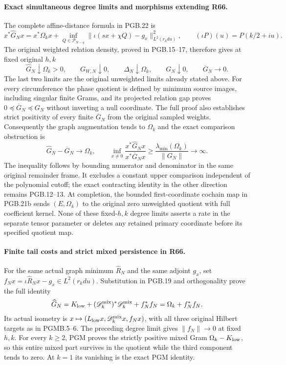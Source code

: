 \paragraph{Exact simultaneous degree limits and morphisms extending R66.}
The complete affine-distance formula in PGB.22 is
\[
 x^*\widehat G_Nx=x^*\Omega_kx+
 \inf_{Q\in\mathcal P_{N-q}}
 \|\iota(sx+\chi Q)-g_x\|_{L^2(r_kdu)}^2,
 \qquad (\iota P)(u)=P(k/2+iu).
\]
The original weighted relation density, proved in PGB.15--17,
therefore gives at fixed original $h,k$
\[
 \widehat G_N\downarrow\Omega_k>0,\qquad
 G_{W,N}\downarrow0,\qquad\Delta_N\downarrow\Omega_k,
 \qquad G_N\downarrow0,\qquad\overline G_N\to0.
\]
The last two limits are the original unweighted limits already
stated above. For every circumference the phase quotient is
defined by minimum source images, including singular finite
Grams, and its projected relation gap proves
$0\preceq\overline G_N\preceq G_N$ without inverting a null
coordinate. The full proof also establishes strict positivity
of every finite $\overline G_N$ from the original sampled
weights. Consequently the graph augmentation tends to
$\Omega_k$ and the exact comparison obstruction is
\[
 \widehat G_N-\overline G_N\longrightarrow\Omega_k,
 \qquad
 \inf_{x\ne0}\frac{x^*\widehat G_Nx}{x^*\overline G_Nx}
 \geq\frac{\lambda_{\min}(\Omega_k)}{\|G_N\|}
                          \longrightarrow\infty.
\]
The inequality follows by bounding numerator and denominator
in the same original remainder frame. It excludes a constant
upper comparison independent of the polynomial cutoff;
the exact contracting identity in the other direction remains
PGB.12--13. At completion, the bounded first-coordinate
cochain map in PGB.21b sends $(E,\Omega_k)$ to the original
zero unweighted quotient with full coefficient kernel. None
of these fixed-$h,k$ degree limits asserts a rate in the
separate tensor parameter or deletes any retained primary
coordinate before its specified quotient map.


\paragraph{Finite tail costs and strict mixed persistence in R66.}
For the same actual graph minimum $\widehat R_N$ and the same
adjoint $g_x$, set
$f_Nx=\iota\widehat R_Nx-g_x\in L^2(r_kdu)$.
Substitution in PGB.19 and orthogonality prove the full identity
\[
 \widehat G_N
 =K_{\rm low}+(\mathscr D_k^{\rm mix})^*
            \mathscr D_k^{\rm mix}+f_N^*f_N
 =\Omega_k+f_N^*f_N.
\]
Its actual isometry is
$x\mapsto(L_{\rm low}x,\mathscr D_k^{\rm mix}x,f_Nx)$,
with all three original Hilbert targets as in PGMB.5--6.
The preceding degree limit gives $\|f_N\|\to0$ at fixed
$h,k$. For every $k\geq2$, PGM proves the strictly positive
mixed Gram $\Omega_k-K_{\rm low}$, so this entire mixed
part survives in the quotient while the third component
tends to zero. At $k=1$ its vanishing is the exact PGM identity.

